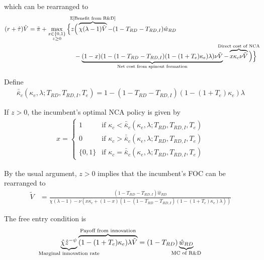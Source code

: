 \documentclass[11pt,english]{article}
\begin{document}
which can be rearranged to
\begin{align}
(r + \hat{\tau}) \tilde{V} = \tilde{\pi} + \max_{\substack{x \in \{0,1\} \\ z \ge 0}} \Big\{z &\Big( \overbrace{\chi (\lambda - 1) \tilde{V}}^{\mathclap{\mathbb{E}[\textrm{Benefit from R\&D}]}}- (1-T_{RD}- T_{RD,I})\hat{w}_{RD} \\
&-  \underbrace{(1-x)(1 - (1-T_{RD} - T_{RD,I})(1-(1+T_e)\kappa_{e})\lambda)\nu \tilde{V}}_{\mathclap{\text{Net cost from spinout formation}}} - \overbrace{x \kappa_{c}\nu \tilde{V}}^{\mathclap{\text{Direct cost of NCA}}}\Big) \Big\} \label{eq:hjb_incumbent_all_2}
\end{align}

Define
\begin{align}
\bar{\bar{\kappa}}_c(\kappa_e,\lambda;T_{RD},T_{RD,I},T_e) = 1 - (1-T_{RD} - T_{RD,I})(1-(1+T_e)\kappa_e)\lambda  \label{eq:barkappa_all}
\end{align} 

If $z > 0$, the incumbent's optimal NCA policy is given by 
\begin{align}
x = \begin{cases}
1 & \textrm{if } \kappa_c < \bar{\bar{\kappa}}_c (\kappa_e, \lambda;T_{RD},T_{RD,I},T_e)\\
0 & \textrm{if } \kappa_c > \bar{\bar{\kappa}}_c (\kappa_e, \lambda;T_{RD},T_{RD,I},T_e)\\
\{0,1\} & \textrm{if } \kappa_c = \bar{\bar{\kappa}}_c (\kappa_e, \lambda;T_{RD},T_{RD,I},T_e)
\end{cases} \label{eq:nca_policy_all}
\end{align}


By the usual argument, $z > 0$ implies that the incumbent's FOC can be rearranged to
\begin{align}
\tilde{V} &= \frac{(1-T_{RD} - T_{RD,I})\hat{w}_{RD}}{\chi(\lambda -1) - \nu (x\kappa_c + (1-x)(1 - (1-T_{RD} - T_{RD,I})(1-(1+T_e)\kappa_e)\lambda)) } \label{eq:hjb_incumbent_foc_all}
\end{align}

The free entry condition is
\begin{align}
\underbrace{\hat{\chi} \hat{z}^{-\psi}}_{\mathclap{\text{Marginal innovation rate}}} \overbrace{(1-(1+T_e)\kappa_e) \lambda \tilde{V}}^{\mathclap{\text{Payoff from innovation}}} &= (1-T_{RD})\underbrace{\hat{w}_{RD}}_{\mathclap{\text{MC of R\&D}}} \label{eq:free_entry_condition_all}
\end{align}
\end{document}

